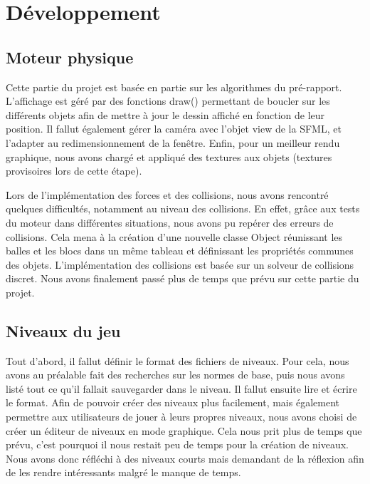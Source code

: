 \chapter{Développement}

\section{Moteur physique}

Cette partie du projet est basée en partie sur les algorithmes du pré-rapport.
L'affichage est géré par des fonctions draw() permettant de boucler
sur les différents objets afin de mettre à jour le dessin affiché en
fonction de leur position. Il fallut également gérer la caméra avec
l'objet view de la SFML, et l'adapter au redimensionnement de la
fenêtre. Enfin, pour un meilleur rendu graphique, nous avons chargé
et appliqué des textures aux objets (textures provisoires lors de
cette étape).

Lors de l'implémentation des forces et des collisions, nous avons
rencontré quelques difficultés, notamment au niveau des collisions.
En effet, grâce aux tests du moteur dans différentes situations,
nous avons pu repérer des erreurs de collisions. Cela mena à la
création d'une nouvelle classe Object réunissant les balles et les
blocs dans un même tableau et définissant les propriétés communes
des objets. L'implémentation des collisions est basée sur un
solveur de collisions discret. Nous avons finalement passé plus de
temps que prévu sur cette partie du projet.
\cite{develop-collision-solver,develop-collision-stability,develop-game-loop}

\section{Niveaux du jeu}

Tout d'abord, il fallut définir le format des fichiers de niveaux. Pour cela, nous avons au préalable fait des recherches sur les normes de base, puis nous avons listé tout ce qu'il fallait sauvegarder dans le niveau. Il fallut ensuite lire et écrire le format. Afin de pouvoir créer des niveaux
plus facilement, mais également permettre aux utilisateurs de jouer
à leurs propres niveaux, nous avons choisi de créer un éditeur de
niveaux en mode graphique. Cela nous prit plus de temps que prévu,
c'est pourquoi il nous restait peu de temps pour la création de
niveaux. Nous avons donc réfléchi à des niveaux courts mais
demandant de la réflexion afin de les rendre intéressants
malgré le manque de temps.

